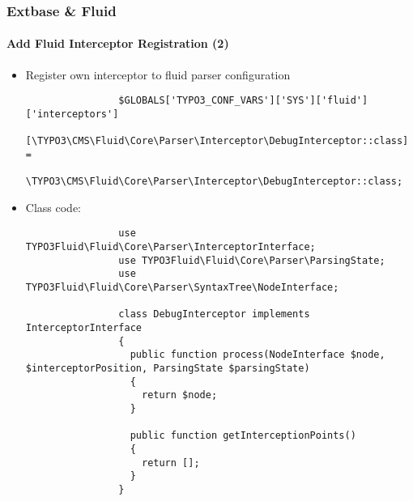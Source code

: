\begin{frame}[fragile]
	\frametitle{Extbase \& Fluid}
	\framesubtitle{Add Fluid Interceptor Registration (2)}

	\lstset{basicstyle=\tiny\ttfamily}

	\begin{itemize}

		\item Register own interceptor to fluid parser configuration

			\begin{lstlisting}
				$GLOBALS['TYPO3_CONF_VARS']['SYS']['fluid']['interceptors']
			      [\TYPO3\CMS\Fluid\Core\Parser\Interceptor\DebugInterceptor::class] =
				  \TYPO3\CMS\Fluid\Core\Parser\Interceptor\DebugInterceptor::class;
			\end{lstlisting}

		\item Class code:

			\begin{lstlisting}
				use TYPO3Fluid\Fluid\Core\Parser\InterceptorInterface;
				use TYPO3Fluid\Fluid\Core\Parser\ParsingState;
				use TYPO3Fluid\Fluid\Core\Parser\SyntaxTree\NodeInterface;

				class DebugInterceptor implements InterceptorInterface
				{
				  public function process(NodeInterface $node, $interceptorPosition, ParsingState $parsingState)
				  {
				    return $node;
				  }

				  public function getInterceptionPoints()
				  {
				    return [];
				  }
				}
			\end{lstlisting}

	\end{itemize}

\end{frame}


